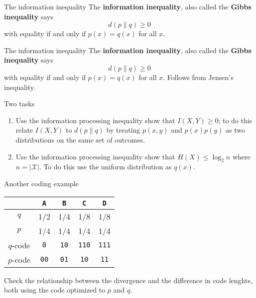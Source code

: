 \documentclass{beamer}
\newcommand{\crish}{\color{reddish}}
\newcommand{\cbla}{\color{black}}
\newcommand{\letter}[1]{\color{blue}\texttt{#1}\color{black}}
\newcommand{\binary}[1]{\color{red}\texttt{#1}\color{black}}
\begin{document}
\begin{frame}{The information inequality}
  The \textbf{information inequality}, also called the \textbf{Gibbs inequality} says
  \crish
  $$d(p\|q)\ge 0$$
  \cbla
  with equality if and only if \crish$p(x)=q(x)$\cbla{} for all \crish$x$\cbla{}.
\end{frame}


\begin{frame}{The information inequality}
  The \textbf{information inequality}, also called the \textbf{Gibbs inequality} says
  \crish
  $$d(p\|q)\ge 0$$
  \cbla
  with equality if and only if \crish$p(x)=q(x)$\cbla{} for all \crish$x$\cbla{}. Follows from Jensen's inequality.
\end{frame}

\begin{frame}{Two tasks}
  \begin{enumerate}
    \item Use the information processing inequality show that
      \crish$I(X,Y)\ge 0$\cbla; to do this relate
      \crish$I(X,Y)$\cbla{} to \crish$d(p\|q)$\cbla{} by treating
      \crish$p(x,y)$\cbla{} and \crish$p(x)p(y)$\cbla{} as two
      distributions on the same set of outcomes.
    \item Use the information processing inequality show that
      \crish$H(X)\le \log_2{n}$\cbla{} where
      \crish$n=|\mathcal{X}|$\cbla. To do this use the uniform
      distribution as $q(x)$.
  \end{enumerate}
\end{frame}


\begin{frame}{Another coding example}

\begin{center}
\begin{tabular}{c|cccc}
&\letter{A}&\letter{B}&\letter{C}&\letter{D}\\
\hline
$q$&1/2&1/4&1/8&1/8\\
$p$&1/4&1/4&1/4&1/4\\
\hline
$q$-code&\binary{0}&\binary{10}&\binary{110}&\binary{111}\\
$p$-code&\binary{00}&\binary{01}&\binary{10}&\binary{11}
\end{tabular}
\end{center}
\cbla Check the relationship between the divergence and the
difference in code lenghts, both using the code optimized to
\crish$p$\cbla{} and \crish$q$\cbla{}.  \cbla
\end{frame}
\end{document}
